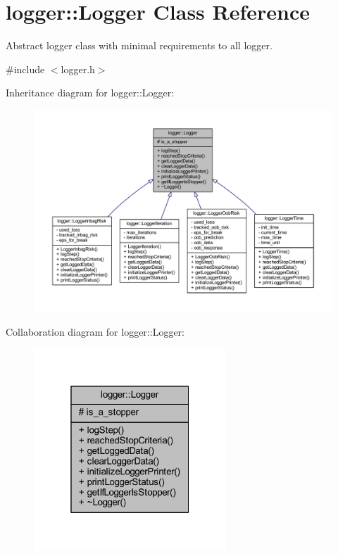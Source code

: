 \hypertarget{classlogger_1_1_logger}{}\section{logger\+:\+:Logger Class Reference}
\label{classlogger_1_1_logger}


Abstract logger class with minimal requirements to all logger.  




{\ttfamily \#include $<$logger.\+h$>$}



Inheritance diagram for logger\+:\+:Logger\+:
\nopagebreak
\begin{figure}[H]
\begin{center}
\leavevmode
\includegraphics[width=350pt]{classlogger_1_1_logger__inherit__graph}
\end{center}
\end{figure}


Collaboration diagram for logger\+:\+:Logger\+:\nopagebreak
\begin{figure}[H]
\begin{center}
\leavevmode
\includegraphics[width=205pt]{classlogger_1_1_logger__coll__graph}
\end{center}
\end{figure}
